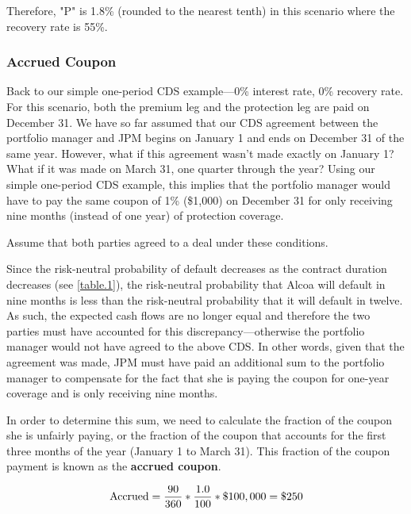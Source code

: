 \documentclass[article]{jss}
\begin{document}
Therefore, "P" is 1.8\% (rounded to the nearest tenth) in this scenario where the recovery rate is 55\%.

\subsubsection{Accrued Coupon}
\label{sec:AccruedCoupon}

Back to our simple one-period CDS example---0\% interest rate, 0\% recovery rate. For this scenario, both the premium leg and the protection leg are paid on December 31. We have so far assumed that our CDS agreement between the portfolio manager and JPM begins on January 1 and ends on December 31 of the same year. However, what if this agreement wasn't made exactly on January 1? What if it was made on March 31, one quarter through the year? Using our simple one-period CDS example, this implies that the portfolio manager would have to pay the same coupon of 1\% (\$1,000) on December 31 for only receiving nine months (instead of one year) of protection coverage.

Assume that both parties agreed to a deal under these conditions. 

Since the risk-neutral probability of default decreases as the contract duration decreases (see \ref{table.1}), the risk-neutral probability that Alcoa will default in nine months is less than the risk-neutral probability that it will default in twelve. As such, the expected cash flows are no longer equal and therefore the two parties must have accounted for this discrepancy---otherwise the portfolio manager would not have agreed to the above CDS. In other words, given that the agreement was made, JPM must have paid an additional sum to the portfolio manager to compensate for the fact that she is paying the coupon for one-year coverage and is only receiving nine months.

In order to determine this sum, we need to calculate the fraction of the coupon she is unfairly paying, or the fraction of the coupon that accounts for the first three months of the year (January 1 to March 31). This fraction of the coupon payment is known as the \textbf{accrued coupon}.

\begin{equation}
 \begin{aligned}
  {\rm Accrued = \frac{90}{360}*\frac{1.0}{100}*\$100,000 = \$250}
    \end{aligned}
\end{equation}
\end{document}
